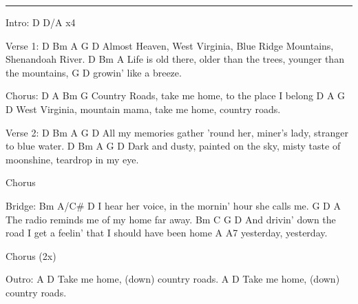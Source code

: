 \noindent\rule{\columnwidth}{1pt}

\begin{lstsong}
Intro: D  D/A  x4
 
Verse 1:
D              Bm             A                       G          D
  Almost Heaven, West Virginia, Blue Ridge Mountains, Shenandoah River.
D                    Bm                    A                           
  Life is old there, older than the trees, younger than the mountains, 
G                D
growin' like a breeze.
 
Chorus:
        D              A            Bm        G
Country Roads, take me home, to the place I belong
        D               A             G             D
West Virginia, mountain mama, take me home, country roads.
 
Verse 2:
D               Bm                 A               G                D
 All my memories  gather 'round her, miner's lady, stranger to blue water.
D                 Bm                  A                         G              D
  Dark and dusty, painted on the sky, misty taste of moonshine, teardrop in my eye.

Chorus
 
Bridge:
Bm          A/C#          D
 I hear her voice, in the mornin' hour she calls me.
    G       D              A
The radio reminds me of my home far away.
    Bm               C            G              D
And drivin' down the road I get a feelin' that I should have been home 
A                A7
yesterday, yesterday.
 
Chorus (2x)
 
Outro:
        A                    D
Take me home, (down) country roads.
        A                    D
Take me home, (down) country roads.
\end{lstsong}
\newpage


